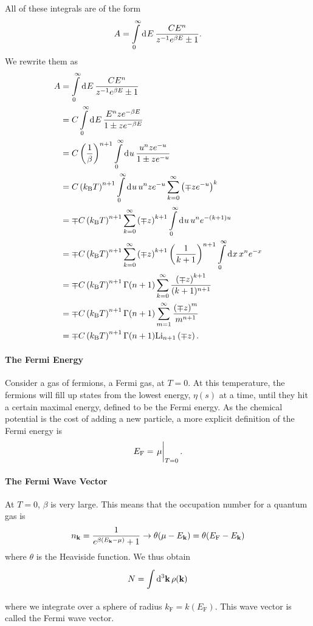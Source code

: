 All of these integrals are of the form
\begin{align*}
	A = \int\limits_{0}^{\infty}\dd[]{E}\frac{CE^{n}}{z^{-1}e^{\beta E} \pm 1}.
\end{align*}
We rewrite them as
\begin{align*}
	A &= \int\limits_{0}^{\infty}\dd[]{E}\frac{CE^{n}}{z^{-1}e^{\beta E} \pm 1} \\
	  &= C\int\limits_{0}^{\infty}\dd[]{E}\frac{E^{n}ze^{-\beta E}}{1 \pm ze^{-\beta E}} \\
	  &= C\left(\frac{1}{\beta}\right)^{n + 1}\int\limits_{0}^{\infty}\dd[]{u}\frac{u^{n}ze^{-u}}{1 \pm ze^{-u}} \\
	  &= C\left(k_{\text{B}} T\right)^{n + 1}\int\limits_{0}^{\infty}\dd[]{u}u^{n}ze^{-u}\sum\limits_{k = 0}^{\infty}\left(\mp ze^{-u}\right)^{k} \\
	  &= \mp C\left(k_{\text{B}} T\right)^{n + 1}\sum\limits_{k = 0}^{\infty}\left(\mp z\right)^{k + 1}\int\limits_{0}^{\infty}\dd[]{u}u^{n}e^{-(k + 1)u} \\
	  &= \mp C\left(k_{\text{B}} T\right)^{n + 1}\sum\limits_{k = 0}^{\infty}\left(\mp z\right)^{k + 1}\left(\frac{1}{k + 1}\right)^{n + 1}\int\limits_{0}^{\infty}\dd[]{x}x^{n}e^{-x} \\
	  &= \mp C\left(k_{\text{B}} T\right)^{n + 1}\Gamma(n + 1)\sum\limits_{k = 0}^{\infty}\frac{\left(\mp z\right)^{k + 1}}{(k + 1)^{n + 1}} \\
	  &= \mp C\left(k_{\text{B}} T\right)^{n + 1}\Gamma(n + 1)\sum\limits_{m = 1}^{\infty}\frac{\left(\mp z\right)^{m}}{m^{n + 1}} \\
	  &= \mp C\left(k_{\text{B}} T\right)^{n + 1}\Gamma(n + 1)\text{Li}_{n + 1}\left(\mp z\right).
\end{align*}

\paragraph{The Fermi Energy}
Consider a gas of fermions, a Fermi gas, at $T = 0$. At this temperature, the fermions will fill up states from the lowest energy, $\eta(s)$ at a time, until they hit a certain maximal energy, defined to be the Fermi energy. As the chemical potential is the cost of adding a new particle, a more explicit definition of the Fermi energy is
\begin{align*}
	E_{\text{F}} = \eval{\mu}_{T = 0}.
\end{align*}

\paragraph{The Fermi Wave Vector}
At $T = 0$, $\beta$ is very large. This means that the occupation number for a quantum gas is
\begin{align*}
	n_{\vb{k}} = \frac{1}{e^{\beta(E_{\vb{k}} - \mu)} + 1} \to \theta(\mu - E_{\vb{k}}) = \theta(E_{\text{F}} - E_{\vb{k}})
\end{align*}
where $\theta$ is the Heaviside function. We thus obtain
\begin{align*}
	N = \int\limits_{}^{}\dd[3]{\vb{k}}\rho(\vb{k})
\end{align*}
where we integrate over a sphere of radius $k_{\text{F}} = k(E_{\text{F}})$. This wave vector is called the Fermi wave vector.

